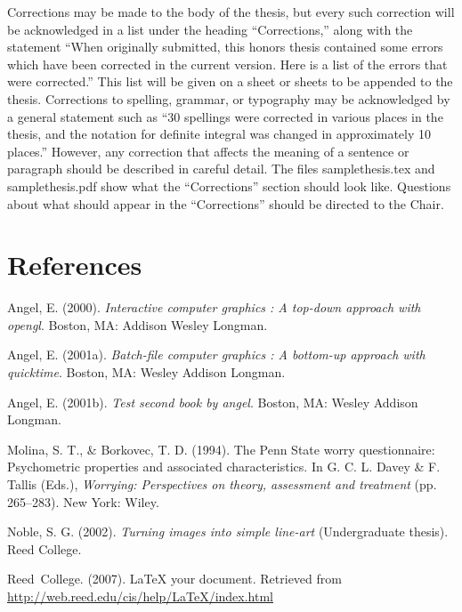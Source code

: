 \documentclass[12pt, twoside]{amherstthesis}
\begin{document}
Corrections may be made to the body of the thesis, but every such correction will be acknowledged in a list under the heading ``Corrections,'' along with the statement ``When originally submitted, this honors thesis contained some errors which have been corrected in the current version. Here is a list of the errors that were corrected.'' This list will be given on a sheet or sheets to be appended to the thesis. Corrections to spelling, grammar, or typography may be acknowledged by a general statement such as ``30 spellings were corrected in various places in the thesis, and the notation for definite integral was changed in approximately 10 places.'' However, any correction that affects the meaning of a sentence or paragraph should be described in careful detail. The files samplethesis.tex and samplethesis.pdf show what the ``Corrections'' section should look like. Questions about what should appear in the ``Corrections'' should be directed to the Chair.

\backmatter

\hypertarget{references}{%
\chapter*{References}\label{references}}

\noindent

\setlength{\parindent}{-0.20in}
\setlength{\leftskip}{0.20in}
\setlength{\parskip}{8pt}

\hypertarget{refs}{}
\leavevmode\hypertarget{ref-angel2000}{}%
Angel, E. (2000). \emph{Interactive computer graphics : A top-down approach with opengl}. Boston, MA: Addison Wesley Longman.

\leavevmode\hypertarget{ref-angel2001}{}%
Angel, E. (2001a). \emph{Batch-file computer graphics : A bottom-up approach with quicktime}. Boston, MA: Wesley Addison Longman.

\leavevmode\hypertarget{ref-angel2002a}{}%
Angel, E. (2001b). \emph{Test second book by angel}. Boston, MA: Wesley Addison Longman.

\leavevmode\hypertarget{ref-Molina1994}{}%
Molina, S. T., \& Borkovec, T. D. (1994). The Penn State worry questionnaire: Psychometric properties and associated characteristics. In G. C. L. Davey \& F. Tallis (Eds.), \emph{Worrying: Perspectives on theory, assessment and treatment} (pp. 265--283). New York: Wiley.

\leavevmode\hypertarget{ref-noble2002}{}%
Noble, S. G. (2002). \emph{Turning images into simple line-art} (Undergraduate thesis). Reed College.

\leavevmode\hypertarget{ref-reedweb2007}{}%
Reed~College. (2007). LaTeX your document. Retrieved from \url{http://web.reed.edu/cis/help/LaTeX/index.html}

\end{document}
